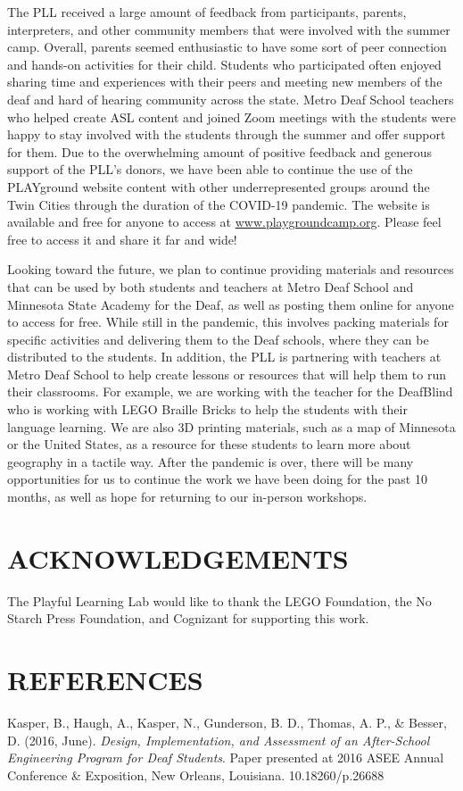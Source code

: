 \documentclass[11.5pt]{sig-alternate}
\begin{document}
\begin{large}
The PLL received a large amount of feedback from participants, parents, interpreters, and other community members that were involved with the summer camp. Overall, parents seemed enthusiastic to have some sort of peer connection and hands-on activities for their child. Students who participated often enjoyed sharing time and experiences with their peers and meeting new members of the deaf and hard of hearing community across the state. Metro Deaf School teachers who helped create ASL content and joined Zoom meetings with the students were happy to stay involved with the students through the summer and offer support for them. Due to the overwhelming amount of positive feedback and generous support of the PLL’s donors, we have been able to continue the use of the PLAYground website content with other underrepresented groups around the Twin Cities through the duration of the COVID-19 pandemic. The website is available and free for anyone to access at \url{www.playgroundcamp.org}. Please feel free to access it and share it far and wide! 

Looking toward the future, we plan to continue providing materials and resources that can be used by both students and teachers at Metro Deaf School and Minnesota State Academy for the Deaf, as well as posting them online for anyone to access for free. While still in the pandemic, this involves packing materials for specific activities and delivering them to the Deaf schools, where they can be distributed to the students. In addition, the PLL is partnering with teachers at Metro Deaf School to help create lessons or resources that will help them to run their classrooms. For example, we are working with the teacher for the DeafBlind who is working with LEGO Braille Bricks to help the students with their language learning. We are also 3D printing materials, such as a map of Minnesota or the United States, as a resource for these students to learn more about geography in a tactile way. After the pandemic is over, there will be many opportunities for us to continue the work we have been doing for the past 10 months, as well as hope for returning to our in-person workshops. 

\section*{ACKNOWLEDGEMENTS}
The Playful Learning Lab would like to thank the LEGO Foundation, the No Starch Press Foundation, and Cognizant for supporting this work.
\end{large}
 
\section*{REFERENCES}\par 

\leftskip 0.25in
\parindent -0.25in 

Kasper, B., Haugh, A., Kasper, N., Gunderson, B. D., Thomas, A. P., \& Besser, D. (2016, June). \textit{Design, Implementation, and Assessment of an After-School Engineering Program for Deaf Students}. Paper presented at 2016 ASEE Annual Conference \& Exposition, New Orleans, Louisiana. 10.18260/p.26688
\end{document}
